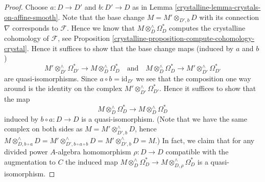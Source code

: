 \begin{proof}

Choose $a : D \to D'$ and $b : D' \to D$ as in
Lemma \ref{crystalline-lemma-crystals-on-affine-smooth}.
Note that the base change $M = M' \otimes_{D', b} D$ with its
connection $\nabla$ corresponds to $\mathcal{F}$. Hence we know
that $M \otimes^\wedge_D \Omega_D^*$ computes the crystalline
cohomology of $\mathcal{F}$, see
Proposition \ref{crystalline-proposition-compute-cohomology-crystal}.
Hence it suffices to show that the base change maps (induced
by $a$ and $b$)
$$
M' \otimes^\wedge_{D'} \Omega^*_{D'}
\longrightarrow
M \otimes^\wedge_D \Omega^*_D
\quad\text{and}\quad
M \otimes^\wedge_D \Omega^*_D
\longrightarrow
M' \otimes^\wedge_{D'} \Omega^*_{D'}
$$
are quasi-isomorphisms. Since $a \circ b = \text{id}_{D'}$ we see
that the composition one way around is the identity on the complex
$M' \otimes^\wedge_{D'} \Omega^*_{D'}$. Hence it suffices to show that
the map
$$
M \otimes^\wedge_D \Omega^*_D
\longrightarrow
M \otimes^\wedge_D \Omega^*_D
$$
induced by $b \circ a : D \to D$ is a quasi-isomorphism. (Note that we
have the same complex on both sides as $M = M' \otimes^\wedge_{D', b} D$,
hence $M \otimes^\wedge_{D, b \circ a} D =
M' \otimes^\wedge_{D', b \circ a \circ b} D =
M' \otimes^\wedge_{D', b} D = M$.) In fact, we claim that for any
divided power $A$-algebra homomorphism $\rho : D \to D$ compatible
with the augmentation to $C$ the induced map
$M \otimes^\wedge_D \Omega^*_D \to M \otimes^\wedge_{D, \rho} \Omega^*_D$
is a quasi-isomorphism.


\end{proof}
